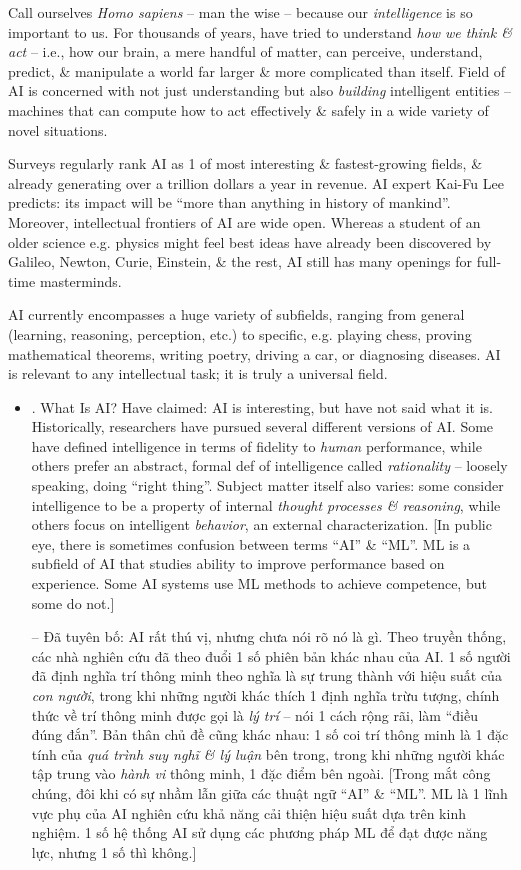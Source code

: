 \documentclass{article}
\begin{document}
\begin{itemize}
\begin{itemize}
		Call ourselves {\it Homo sapiens} -- man the wise -- because our {\it intelligence} is so important to us. For thousands of years, have tried to understand {\it how we think \& act} -- i.e., how our brain, a mere handful of matter, can perceive, understand, predict, \& manipulate a world far larger \& more complicated than itself. Field of AI is concerned with not just understanding but also {\it building} intelligent entities -- machines that can compute how to act effectively \& safely in a wide variety of novel situations.

		Surveys regularly rank AI as 1 of most interesting \& fastest-growing fields, \& already generating over a trillion dollars a year in revenue. AI expert {\sc Kai-Fu Lee} predicts: its impact will be ``more than anything in history of mankind''. Moreover, intellectual frontiers of AI are wide open. Whereas a student of an older science e.g. physics might feel best ideas have already been discovered by {\sc Galileo, Newton, Curie, Einstein}, \& the rest, AI still has many openings for full-time masterminds.

		AI currently encompasses a huge variety of subfields, ranging from general (learning, reasoning, perception, etc.) to specific, e.g. playing chess, proving mathematical theorems, writing poetry, driving a car, or diagnosing diseases. AI is relevant to any intellectual task; it is truly a universal field.
		\begin{itemize}
			\item {. What Is AI?} Have claimed: AI is interesting, but have not said what it is. Historically, researchers have pursued several different versions of AI. Some have defined intelligence in terms of fidelity to {\it human} performance, while others prefer an abstract, formal def of intelligence called {\it rationality} -- loosely speaking, doing ``right thing''. Subject matter itself also varies: some consider intelligence to be a property of internal {\it thought processes \& reasoning}, while others focus on intelligent {\it behavior}, an external characterization. [In public eye, there is sometimes confusion between terms ``AI'' \& ``ML''. ML is a subfield of AI that studies ability to improve performance based on experience. Some AI systems use ML methods to achieve competence, but some do not.]

			-- Đã tuyên bố: AI rất thú vị, nhưng chưa nói rõ nó là gì. Theo truyền thống, các nhà nghiên cứu đã theo đuổi 1 số phiên bản khác nhau của AI. 1 số người đã định nghĩa trí thông minh theo nghĩa là sự trung thành với hiệu suất của {\it con người}, trong khi những người khác thích 1 định nghĩa trừu tượng, chính thức về trí thông minh được gọi là {\it lý trí} -- nói 1 cách rộng rãi, làm ``điều đúng đắn''. Bản thân chủ đề cũng khác nhau: 1 số coi trí thông minh là 1 đặc tính của {\it quá trình suy nghĩ \& lý luận} bên trong, trong khi những người khác tập trung vào {\it hành vi} thông minh, 1 đặc điểm bên ngoài. [Trong mắt công chúng, đôi khi có sự nhầm lẫn giữa các thuật ngữ ``AI'' \& ``ML''. ML là 1 lĩnh vực phụ của AI nghiên cứu khả năng cải thiện hiệu suất dựa trên kinh nghiệm. 1 số hệ thống AI sử dụng các phương pháp ML để đạt được năng lực, nhưng 1 số thì không.]


\end{itemize}
\end{itemize}
\end{itemize}
\end{document}
